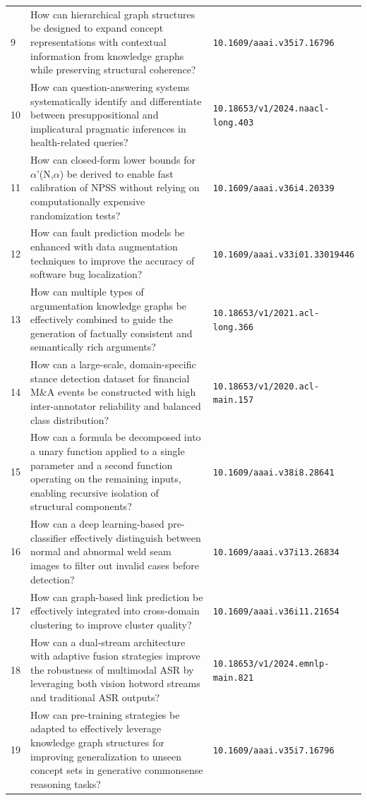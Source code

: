 \documentclass[runningheads]{llncs}
\begin{document}
\begin{longtable}{@{}p{0.5cm}p{7.2cm}p{2.5cm}@{}}
9 & How can hierarchical graph structures be designed to expand concept representations with contextual information from knowledge graphs while preserving structural coherence? & \texttt{10.1609/aaai.v35i7.16796} \\
10 & How can question-answering systems systematically identify and differentiate between presuppositional and implicatural pragmatic inferences in health-related queries? & \texttt{10.18653/v1/2024.naacl-long.403} \\
11 & How can closed-form lower bounds for $\alpha$'(N,$\alpha$) be derived to enable fast calibration of NPSS without relying on computationally expensive randomization tests? & \texttt{10.1609/aaai.v36i4.20339} \\
12 & How can fault prediction models be enhanced with data augmentation techniques to improve the accuracy of software bug localization? & \texttt{10.1609/aaai.v33i01.33019446} \\
13 & How can multiple types of argumentation knowledge graphs be effectively combined to guide the generation of factually consistent and semantically rich arguments? & \texttt{10.18653/v1/2021.acl-long.366} \\
14 & How can a large-scale, domain-specific stance detection dataset for financial M\&A events be constructed with high inter-annotator reliability and balanced class distribution? & \texttt{10.18653/v1/2020.acl-main.157} \\
15 & How can a formula be decomposed into a unary function applied to a single parameter and a second function operating on the remaining inputs, enabling recursive isolation of structural components? & \texttt{10.1609/aaai.v38i8.28641} \\
16 & How can a deep learning-based pre-classifier effectively distinguish between normal and abnormal weld seam images to filter out invalid cases before detection? & \texttt{10.1609/aaai.v37i13.26834} \\
17 & How can graph-based link prediction be effectively integrated into cross-domain clustering to improve cluster quality? & \texttt{10.1609/aaai.v36i11.21654} \\
18 & How can a dual-stream architecture with adaptive fusion strategies improve the robustness of multimodal ASR by leveraging both vision hotword streams and traditional ASR outputs? & \texttt{10.18653/v1/2024.emnlp-main.821} \\
19 & How can pre-training strategies be adapted to effectively leverage knowledge graph structures for improving generalization to unseen concept sets in generative commonsense reasoning tasks? & \texttt{10.1609/aaai.v35i7.16796} \\

\end{longtable}
\end{document}
